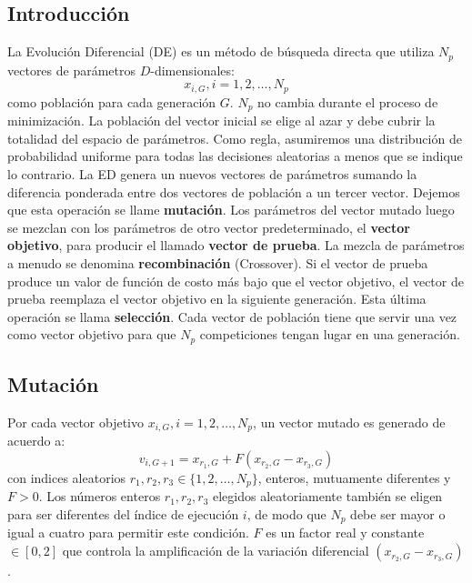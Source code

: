 \documentclass[10pt,a4paper]{article}
\begin{document}
\subsection{Introducción}
La Evolución Diferencial (DE) es un método de búsqueda directa que utiliza $N_{p}$ vectores de parámetros $D$-dimensionales:
\begin{equation}
x_{i,G}, i = 1, 2, \ldots , N_{p}
\end{equation}
como población para cada generación $G$. $N_{p}$ no cambia durante el proceso de minimización. La población del vector inicial se elige al azar y debe cubrir la totalidad del espacio de parámetros. Como regla, asumiremos una distribución de probabilidad uniforme para todas las decisiones aleatorias a menos que se indique lo contrario. La ED genera un nuevos vectores de parámetros sumando la diferencia ponderada entre dos vectores de población a un tercer vector. Dejemos que esta operación se llame \textbf{mutación}. Los parámetros del vector mutado luego se mezclan con los parámetros de otro vector predeterminado, el \textbf{vector objetivo}, para producir el llamado \textbf{vector de prueba}. La mezcla de parámetros a menudo se denomina
\textbf{recombinación} (Crossover). Si el vector de prueba produce un valor de función de costo más bajo que el vector objetivo, el vector de prueba
reemplaza el vector objetivo en la siguiente generación. Esta última operación se llama \textbf{selección}. Cada vector de población tiene que servir una vez como vector objetivo para que $N_{p}$ competiciones tengan lugar en una generación.

\subsection{Mutación}

Por cada vector objetivo $x_{i,G}, i = 1, 2, \ldots , N_{p}$, un vector mutado es generado de acuerdo a:
\begin{equation}
v_{i,G+1} = x_{r_{1},G} + F (x_{r_{2},G} -x_{r_{3},G})
\end{equation}
con indices aleatorios $r_{1}, r_{2}, r_{3} \in \{1,2, \ldots, N_{p}\}$, enteros, mutuamente diferentes y $F> 0$. Los números enteros $r_{1}, r_{2}, r_{3}$ elegidos aleatoriamente también se eligen para ser diferentes del índice de ejecución $i$, de modo que $N_{p}$ debe ser mayor o igual a cuatro para permitir este condición. $F$ es un factor real y constante  $\in [0, 2]$ que controla la amplificación de la variación diferencial $(x_{r_{2},G} -x_{r_{3},G})$.
\end{document}
